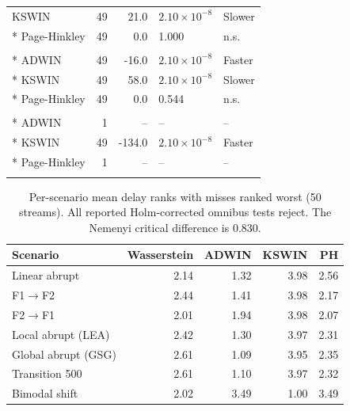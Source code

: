 \documentclass[preprint,12pt]{elsarticle}
\begin{document}
\begin{longtable}{lrrll}
KSWIN & 49 & 21.0 & $2.10\times10^{-8}$ & Slower\\*
Page-Hinkley & 49 & 0.0 & 1.000 & n.s.\\
\addlinespace
\multicolumn{5}{l}{\textit{Transition 500}}\\*
ADWIN & 49 & -16.0 & $2.10\times10^{-8}$ & Faster\\*
KSWIN & 49 & 58.0 & $2.10\times10^{-8}$ & Slower\\*
Page-Hinkley & 49 & 0.0 & 0.544 & n.s.\\
\addlinespace
\multicolumn{5}{l}{\textit{Bimodal shift}}\\*
ADWIN & 1 & -- & -- & --\\*
KSWIN & 49 & -134.0 & $2.10\times10^{-8}$ & Faster\\*
Page-Hinkley & 1 & -- & -- & --\\
\addlinespace
\end{longtable}\endgroup\begin{table}[htbp]\centering\small
\caption{Per-scenario mean delay ranks with misses ranked worst (50 streams). All reported Holm-corrected omnibus tests reject. The Nemenyi critical difference is 0.830.}\label{tab:ranks}
\setlength{\tabcolsep}{4pt}\begin{tabular}{lrrrr}
\toprule
Scenario & Wasserstein & ADWIN & KSWIN & PH\\\midrule
Linear abrupt & 2.14 & 1.32 & 3.98 & 2.56\\
F1$\to$F2 & 2.44 & 1.41 & 3.98 & 2.17\\
F2$\to$F1 & 2.01 & 1.94 & 3.98 & 2.07\\
Local abrupt (LEA) & 2.42 & 1.30 & 3.97 & 2.31\\
Global abrupt (GSG) & 2.61 & 1.09 & 3.95 & 2.35\\
Transition 500 & 2.61 & 1.10 & 3.97 & 2.32\\
Bimodal shift & 2.02 & 3.49 & 1.00 & 3.49\\
\bottomrule\end{tabular}\end{table}
\clearpage
\end{document}

